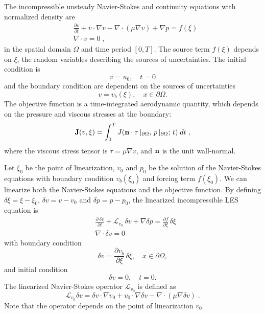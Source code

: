 The incompressible unsteady Navier-Stokes and continuity equations with
normalized density are
\[ \begin{split}
    & \frac{\partial v}{\partial t} + v \cdot \nabla v
        - \nabla \cdot (\mu \nabla v) + \nabla p = f(\xi) \\
    & \nabla \cdot v = 0 \;,
\end{split} \]
in the spatial domain $\Omega$ and time period $[0, T]$.
The source term $f(\xi)$ depends on $\xi$, the random variables describing
the sources of uncertainties.
The initial condition is
\[ v = u_0, \quad t = 0 \]
and the boundary condition are dependent on the sources of
uncertainties
$$v = v_b(\xi), \quad x \in \partial \Omega .$$
The objective function is a time-integrated aerodynamic quantity, which depends
on the pressure and viscous stresses at the boundary:
\[  {\bf J}(v,\xi) = \int_0^T J({\bf n}\cdot\tau\,|_{\partial\Omega},\,
                  p\, |_{\partial\Omega}; \,t)\; dt \;,\]
where the viscous stress tensor is $\tau = \mu \nabla v$,
and $\bf n$ is the unit wall-normal.

Let $\xi_0$ be the point of linearization, $v_0$ and $p_0$ be the solution of
the Navier-Stokes equations with boundary condition $v_b(\xi_0)$ and
forcing term $f(\xi_0)$.
We can linearize both the Navier-Stokes equations and the objective function.
By defining $\delta \xi = \xi - \xi_0$, $\delta v = v - v_0$ and
$\delta p = p - p_0$, the linearized incompressible LES equation is
\begin{equation} \begin{split} \label{linear_ns}
    & \frac{\partial\: \delta v}{\partial t} + \mathcal{L}_{v_0}\, \delta v
      + \nabla \delta p = \frac{\partial f}{\partial \xi}\, \delta \xi \\
    & \nabla \cdot \delta v = 0
\end{split} \end{equation}
with boundary condition
$$ \delta v = \frac{\partial v_b}{\partial \xi} \, \delta\xi,
   \quad x \in \partial \Omega ,$$
and initial condition
$$ \delta v = 0, \quad t = 0 .$$
The linearized Navier-Stokes operator ${\mathcal L}_{v_0}$ is defined as
$$  \mathcal{L}_{v_0} \delta v = \delta v \cdot \nabla v_0
        + v_0 \cdot \nabla \delta v - \nabla \cdot (\mu \nabla \delta v) \;.$$
Note that the operator depends on the point of linearization $v_0$.

